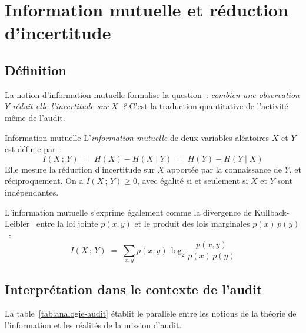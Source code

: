 \section{Information mutuelle et réduction d'incertitude}
\label{sec:info-mutuelle}

\subsection{Définition}

La notion d'information mutuelle formalise la question~: \emph{combien une
observation $Y$ réduit-elle l'incertitude sur $X$~?} C'est la traduction
quantitative de l'activité même de l'audit.

\begin{boxdef}{Information mutuelle}
L'\emph{information mutuelle} de deux variables aléatoires $X$ et $Y$ est
définie par~:
\begin{equation}
  I(X\,;\,Y) \;=\; H(X) - H(X \mid Y) \;=\; H(Y) - H(Y \mid X)
  \label{eq:info-mutuelle}
\end{equation}
Elle mesure la réduction d'incertitude sur $X$ apportée par la connaissance de
$Y$, et réciproquement. On a $I(X\,;\,Y) \geq 0$, avec égalité si et seulement
si $X$ et $Y$ sont indépendantes.
\end{boxdef}

L'information mutuelle s'exprime également comme la divergence de
Kullback-Leibler~\cite{Kullback1951} entre la loi jointe $p(x,y)$ et le produit
des lois marginales $p(x)\,p(y)$~:
\begin{equation}
  I(X\,;\,Y) \;=\; \sum_{x,y} p(x,y)\,\log_2 \frac{p(x,y)}{p(x)\,p(y)}
  \label{eq:kl}
\end{equation}

\subsection{Interprétation dans le contexte de l'audit}

La table~\ref{tab:analogie-audit} établit le parallèle entre les notions de la
théorie de l'information et les réalités de la mission d'audit.

